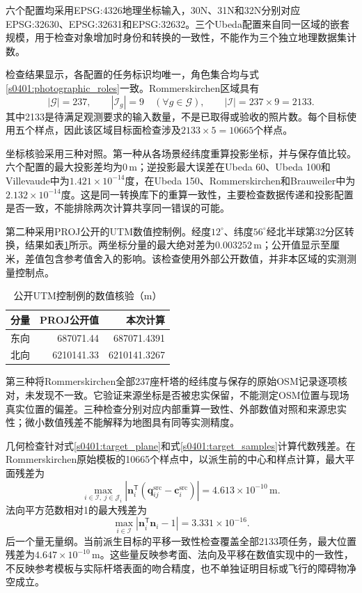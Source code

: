 六个配置均采用EPSG:4326地理坐标输入，30N、31N和32N分别对应EPSG:32630、EPSG:32631和EPSG:32632。三个Ubeda配置来自同一区域的嵌套规模，用于检查对象增加时身份和转换的一致性，不能作为三个独立地理数据集计数。

检查结果显示，各配置的任务标识均唯一，角色集合均与式\eqref{s0401:photographic_roles}一致。Rommerskirchen区域具有
\begin{equation}
 |\mathcal G|=237,
 \qquad |\mathcal I_g|=9\quad(\forall g\in\mathcal G),
 \qquad |\mathcal I|=237\times9=2133.
 \label{s0401:regional_counts}
\end{equation}
其中2133是待满足观测要求的输入数量，不是已取得或验收的照片数。每个目标使用五个样点，因此该区域目标面检查涉及$2133\times5=10665$个样点。

坐标核验采用三种对照。第一种从各场景经纬度重算投影坐标，并与保存值比较。六个配置的最大投影差均为$0\,\mathrm m$；逆投影最大误差在Ubeda 60、Ubeda 100和Villevaude中为$1.421\times10^{-14}$度，在Ubeda 150、Rommerskirchen和Brauweiler中为$2.132\times10^{-14}$度。这是同一转换库下的重算一致性，主要检查数据传递和投影配置是否一致，不能排除两次计算共享同一错误的可能。

第二种采用PROJ公开的UTM数值控制例\cite{PROJUTM}。经度$12^{\circ}$、纬度$56^{\circ}$经北半球第32分区转换，结果如表\ref{s0401:proj_control}所示。两坐标分量的最大绝对差为$0.003252\,\mathrm m$；公开值显示至厘米，差值包含参考值舍入的影响。该检查使用外部公开数值，并非本区域的实测测量控制点。
\begin{table}[htbp]
 \centering\small
 \caption{公开UTM控制例的数值核验（m）}
 \label{s0401:proj_control}
 \begin{tabular}{@{}lrr@{}}
 \toprule
 分量 & PROJ公开值 & 本次计算\\
 \midrule
 东向 & 687071.44 & 687071.4391\\
 北向 & 6210141.33 & 6210141.3267\\
 \bottomrule
 \end{tabular}
\end{table}

第三种将Rommerskirchen全部237座杆塔的经纬度与保存的原始OSM记录逐项核对，未发现不一致。它验证来源坐标是否被忠实保留，不能测定OSM位置与现场真实位置的偏差。三种检查分别对应内部重算一致性、外部数值对照和来源忠实性；微小数值残差不能解释为地图具有同等实测精度。

几何检查针对式\eqref{s0401:target_plane}和式\eqref{s0401:target_samples}计算代数残差。在Rommerskirchen原始模板的10665个样点中，以派生前的中心和样点计算，最大平面残差为
\begin{equation}
 \max_{i\in\mathcal I,\ j\in\mathcal J_i}
 \left|\mathbf n_i^{\mathsf T}(\mathbf q_{ij}^{\mathrm{src}}-\mathbf c_i^{\mathrm{src}})\right|
 =4.613\times10^{-10}\,\mathrm m.
\end{equation}
法向平方范数相对1的最大残差为
\begin{equation}
 \max_{i\in\mathcal I}
 \left|\mathbf n_i^{\mathsf T}\mathbf n_i-1\right|
 =3.331\times10^{-16}.
\end{equation}
后一个量无量纲。当前派生目标的平移一致性检查覆盖全部2133项任务，最大位置残差为$4.647\times10^{-10}\,\mathrm m$。这些量反映参考面、法向及平移在数值实现中的一致性，不反映参考模板与实际杆塔表面的吻合精度，也不单独证明目标或飞行的障碍物净空成立。


